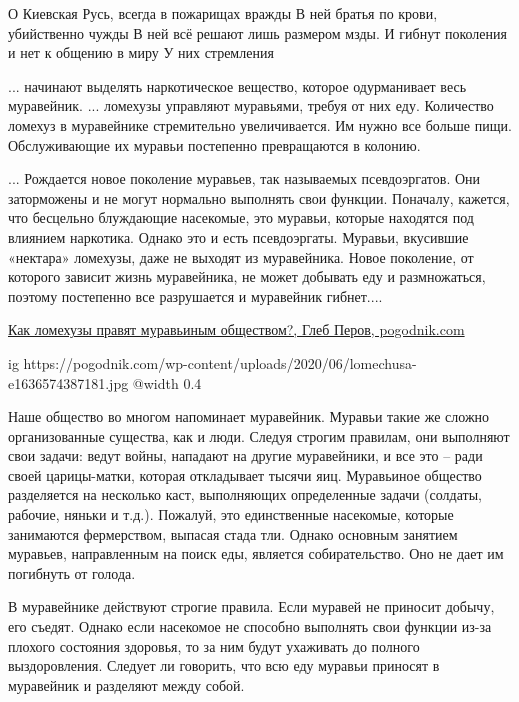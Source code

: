 \begin{itemize}

\obeycr
О Киевская Русь, всегда в пожарищах вражды
В ней братья по крови, убийственно чужды
В ней всё решают лишь размером мзды.
И гибнут поколения и нет
к общению в миру
У них стремления
\restorecr


... начинают выделять наркотическое вещество, которое одурманивает весь
муравейник. ... ломехузы управляют муравьями, требуя от них еду. Количество
ломехуз в муравейнике стремительно увеличивается. Им нужно все больше пищи.
Обслуживающие их муравьи постепенно превращаются в колонию.

... Рождается новое поколение муравьев, так называемых псевдоэргатов. Они
заторможены и не могут нормально выполнять свои функции. Поначалу, кажется, что
бесцельно блуждающие насекомые, это муравьи, которые находятся под влиянием
наркотика. Однако это и есть псевдоэргаты. Муравьи, вкусившие «нектара»
ломехузы, даже не выходят из муравейника. Новое поколение, от которого зависит
жизнь муравейника, не может добывать еду и размножаться, поэтому постепенно все
разрушается и муравейник гибнет....

\href{https://pogodnik.com/novosti/kak-lomehuzy-pravyat-muravinym-obshhestvom}{%
Как ломехузы правят муравьиным обществом?, Глеб Перов, pogodnik.com%
}

\begin{multicols}{2}

\ifcmt
  ig https://pogodnik.com/wp-content/uploads/2020/06/lomechusa-e1636574387181.jpg
  @width 0.4
\fi

Наше общество во многом напоминает муравейник. Муравьи такие же сложно
организованные существа, как и люди. Следуя строгим правилам, они выполняют
свои задачи: ведут войны, нападают на другие муравейники, и все это – ради
своей царицы-матки, которая откладывает тысячи яиц. Муравьиное общество
разделяется на несколько каст, выполняющих определенные задачи (солдаты,
рабочие, няньки и т.д.). Пожалуй, это единственные насекомые, которые
занимаются фермерством, выпасая стада тли. Однако основным занятием муравьев,
направленным на поиск еды, является собирательство. Оно не дает им погибнуть от
голода.

В муравейнике действуют строгие правила. Если муравей не приносит добычу, его
съедят. Однако если насекомое не способно выполнять свои функции из-за плохого
состояния здоровья, то за ним будут ухаживать до полного выздоровления. Следует
ли говорить, что всю еду муравьи приносят в муравейник и разделяют между собой.


\end{multicols}
\end{itemize}
